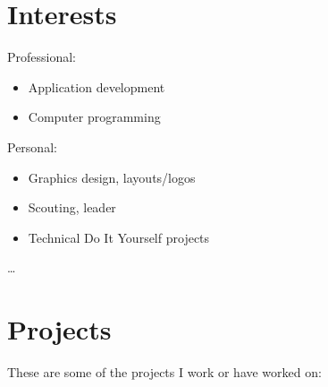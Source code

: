 \documentclass[]{friggeri-cv}
\providecommand{\tightlist}{%
\setlength{\itemsep}{0pt}\setlength{\parskip}{0pt}}
\begin{document}

\section{Interests}

Professional:
\begin{multicols}{2}
\begin{itemize}
  \tightlist{}
  \item Application development
  \item Computer programming
\end{itemize}
\end{multicols}


Personal:
\begin{multicols}{2}
\begin{itemize}
  \tightlist{}
  \item Graphics design, layouts/logos
  \item Scouting, leader
  \item Technical Do It Yourself projects
\end{itemize}
\end{multicols}

\ldots{}

\newpage{}


\section{Projects}

These are some of the projects I work or have worked on:
\end{document}
